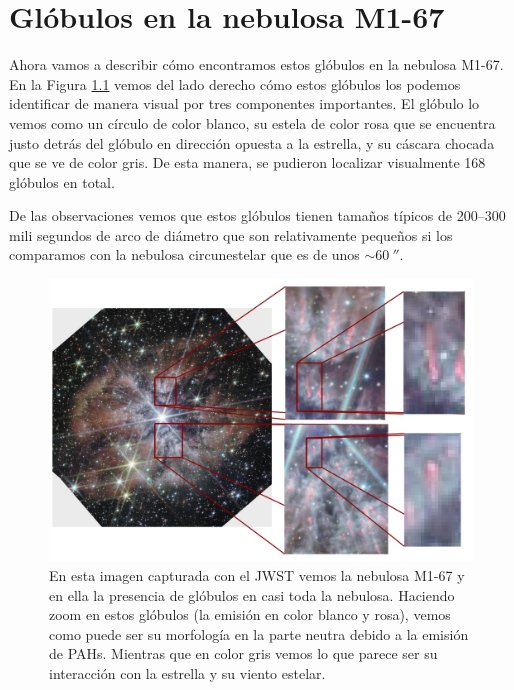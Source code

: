 \documentclass{book}
\begin{document}
\chapter{Glóbulos en la nebulosa M1-67} \label{Chapter : 3}

Ahora vamos a describir cómo encontramos estos glóbulos en la nebulosa M1-67.
En la Figura \ref{fig:nudos WR124} vemos del lado derecho cómo estos glóbulos los podemos identificar de manera visual por tres componentes importantes. El glóbulo lo vemos como un círculo de color blanco,  su estela de color rosa que se encuentra justo detrás del glóbulo en dirección opuesta a la estrella, y su cáscara chocada que se ve de color gris. De esta manera, se pudieron localizar visualmente 168 glóbulos en total.


De las observaciones vemos que estos glóbulos tienen tamaños típicos de 200--300 mili segundos de arco de diámetro que son relativamente pequeños si los comparamos con la nebulosa circunestelar que es de unos $\sim\SI{60}{\arcsecond}$.

\begin{figure}[htb]
    \centering
    \includegraphics[width=\textwidth]{Nuevas imagenes finales/Globulos_JWS_1.pdf}
    \caption{En esta imagen capturada con el JWST vemos la nebulosa M1-67 y en ella la presencia de glóbulos en casi toda la nebulosa. Haciendo zoom en estos glóbulos (la emisión en color blanco y rosa), vemos como puede ser su morfología en la parte neutra debido a la emisión de PAHs. Mientras que en color gris vemos lo que parece ser su interacción con la estrella y su viento estelar.}
    \label{fig:nudos WR124}
\end{figure}
\end{document}

